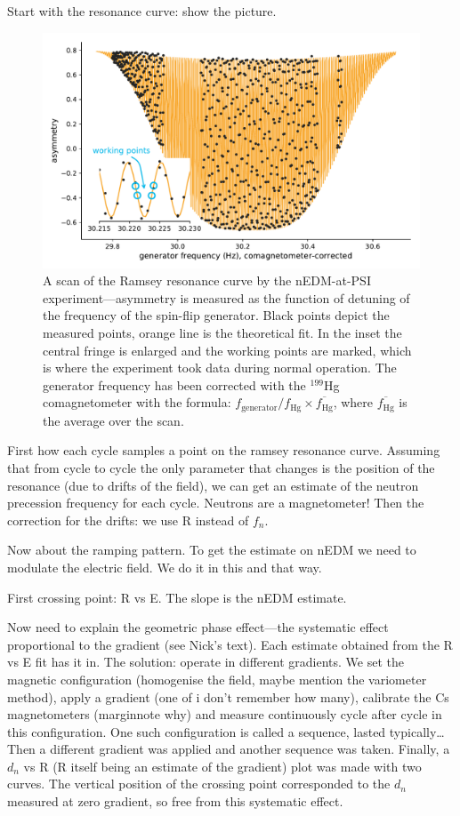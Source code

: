 Start with the resonance curve: show the picture.
\begin{figure}
  \centering
  \includegraphics[width=0.8\linewidth]{gfx/nEDMatPSI/ramsey_scan.pdf}
  \caption{A scan of the Ramsey resonance curve by the nEDM-at-PSI experiment---asymmetry is measured as the function of detuning of the frequency of the spin-flip generator. Black points depict the measured points, orange line is the theoretical fit. In the inset the central fringe is enlarged and the working points are marked, which is where the experiment took data during normal operation. The generator frequency has been corrected with the $^{199}$Hg comagnetometer with the formula: $f_\text{generator} / f_\text{Hg} \times \overline{f_\text{Hg}}$, where $\overline{f_\text{Hg}}$ is the average over the scan.}
  \label{fig:ramsey_scan}
\end{figure}

First how each cycle samples a point on the ramsey resonance curve. Assuming that from cycle to cycle the only parameter that changes is the position of the resonance (due to drifts of the field), we can get an estimate of the neutron precession frequency for each cycle. Neutrons are a magnetometer! Then the correction for the drifts: we use R instead of $f_n$.

Now about the ramping pattern. To get the estimate on nEDM we need to modulate the electric field. We do it in this and that way.

First crossing point: R vs E. The slope is the nEDM estimate.

Now need to explain the geometric phase effect---the systematic effect proportional to the gradient (see Nick's text). Each estimate obtained from the R vs E fit has it in.
The solution: operate in different gradients. We set the magnetic configuration (homogenise the field, maybe mention the variometer method), apply a gradient (one of i don't remember how many), calibrate the Cs magnetometers (marginnote why) and measure continuously cycle after cycle in this configuration. One such configuration is called a sequence, lasted typically\ldots Then a different gradient was applied and another sequence was taken. Finally, a $d_n$ vs R (R itself being an estimate of the gradient) plot was made with two curves. The vertical position of the crossing point corresponded to the $d_n$ measured at zero gradient, so free from this systematic effect.



